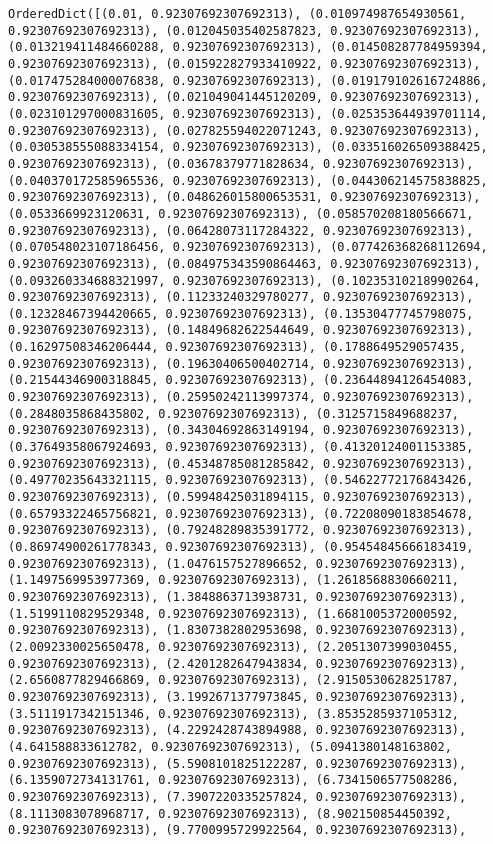 \documentclass[11pt]{article}
\begin{document}
\begin{Verbatim}[commandchars=\\\{\}]
OrderedDict([(0.01, 0.92307692307692313), (0.010974987654930561, 0.92307692307692313), (0.012045035402587823, 0.92307692307692313), (0.013219411484660288, 0.92307692307692313), (0.014508287784959394, 0.92307692307692313), (0.015922827933410922, 0.92307692307692313), (0.017475284000076838, 0.92307692307692313), (0.019179102616724886, 0.92307692307692313), (0.021049041445120209, 0.92307692307692313), (0.023101297000831605, 0.92307692307692313), (0.025353644939701114, 0.92307692307692313), (0.027825594022071243, 0.92307692307692313), (0.030538555088334154, 0.92307692307692313), (0.033516026509388425, 0.92307692307692313), (0.03678379771828634, 0.92307692307692313), (0.040370172585965536, 0.92307692307692313), (0.044306214575838825, 0.92307692307692313), (0.048626015800653531, 0.92307692307692313), (0.0533669923120631, 0.92307692307692313), (0.058570208180566671, 0.92307692307692313), (0.06428073117284322, 0.92307692307692313), (0.070548023107186456, 0.92307692307692313), (0.077426368268112694, 0.92307692307692313), (0.084975343590864463, 0.92307692307692313), (0.093260334688321997, 0.92307692307692313), (0.10235310218990264, 0.92307692307692313), (0.11233240329780277, 0.92307692307692313), (0.12328467394420665, 0.92307692307692313), (0.13530477745798075, 0.92307692307692313), (0.14849682622544649, 0.92307692307692313), (0.16297508346206444, 0.92307692307692313), (0.1788649529057435, 0.92307692307692313), (0.19630406500402714, 0.92307692307692313), (0.21544346900318845, 0.92307692307692313), (0.23644894126454083, 0.92307692307692313), (0.25950242113997374, 0.92307692307692313), (0.2848035868435802, 0.92307692307692313), (0.3125715849688237, 0.92307692307692313), (0.34304692863149194, 0.92307692307692313), (0.37649358067924693, 0.92307692307692313), (0.41320124001153385, 0.92307692307692313), (0.45348785081285842, 0.92307692307692313), (0.49770235643321115, 0.92307692307692313), (0.54622772176843426, 0.92307692307692313), (0.59948425031894115, 0.92307692307692313), (0.65793322465756821, 0.92307692307692313), (0.72208090183854678, 0.92307692307692313), (0.79248289835391772, 0.92307692307692313), (0.86974900261778343, 0.92307692307692313), (0.95454845666183419, 0.92307692307692313), (1.0476157527896652, 0.92307692307692313), (1.1497569953977369, 0.92307692307692313), (1.2618568830660211, 0.92307692307692313), (1.3848863713938731, 0.92307692307692313), (1.5199110829529348, 0.92307692307692313), (1.6681005372000592, 0.92307692307692313), (1.8307382802953698, 0.92307692307692313), (2.0092330025650478, 0.92307692307692313), (2.2051307399030455, 0.92307692307692313), (2.4201282647943834, 0.92307692307692313), (2.6560877829466869, 0.92307692307692313), (2.9150530628251787, 0.92307692307692313), (3.1992671377973845, 0.92307692307692313), (3.5111917342151346, 0.92307692307692313), (3.8535285937105312, 0.92307692307692313), (4.2292428743894988, 0.92307692307692313), (4.641588833612782, 0.92307692307692313), (5.0941380148163802, 0.92307692307692313), (5.5908101825122287, 0.92307692307692313), (6.1359072734131761, 0.92307692307692313), (6.7341506577508286, 0.92307692307692313), (7.3907220335257824, 0.92307692307692313), (8.1113083078968717, 0.92307692307692313), (8.902150854450392, 0.92307692307692313), (9.7700995729922564, 0.92307692307692313), 
\end{Verbatim}
\end{document}
